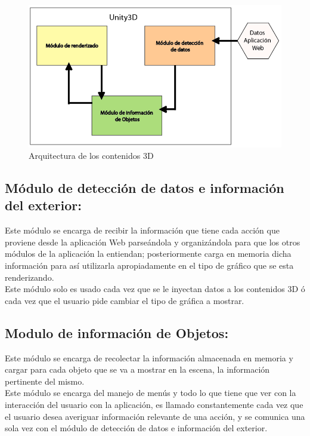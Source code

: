 \begin{figure}[h]
	\centering
		\includegraphics[scale=0.5]{ArquitecturaUnity.png}
		\caption{Arquitectura de los contenidos 3D}
	\label{fig:modules}
\end{figure}


\subsection{Módulo de detección de datos e información del exterior:}
Este módulo se encarga de recibir la información que tiene cada acción que proviene desde la aplicación Web parseándola y organizándola para que los otros módulos de la aplicación la entiendan; posteriormente carga en memoria dicha información para así utilizarla apropiadamente en el tipo de gráfico que se esta renderizando.\\

Este módulo solo es usado cada vez que se le inyectan datos a los contenidos 3D ó cada vez que el usuario pide cambiar el tipo de gráfica a mostrar.\\

\subsection{Modulo de información de Objetos:}
Este módulo se encarga de recolectar la información almacenada en memoria y cargar para cada objeto que se va a mostrar en la escena, la información pertinente del mismo.\\

Este módulo se encarga del manejo de menús y todo lo que tiene que ver con la interacción del usuario con la aplicación, es llamado constantemente cada vez que el usuario desea averiguar información relevante de una acción, y  se comunica una sola vez con el módulo de detección de datos e información del exterior.\\

